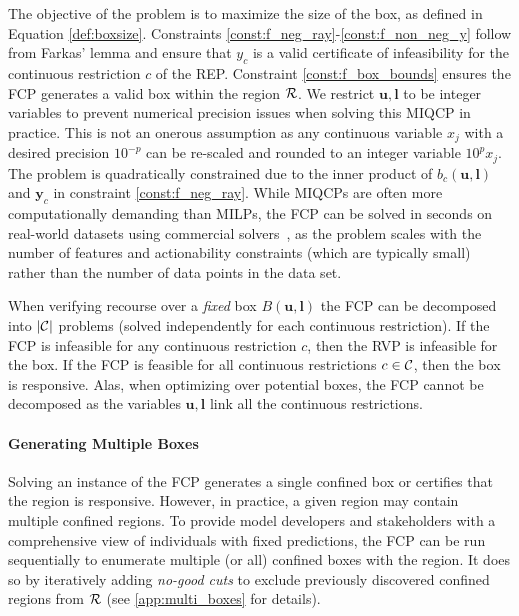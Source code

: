 The objective of the problem is to maximize the size of the box, as defined in Equation \eqref{def:boxsize}. Constraints \eqref{const:f_neg_ray}-\eqref{const:f_non_neg_y} follow from Farkas' lemma and ensure that $y_c$ is a valid certificate of infeasibility for the continuous restriction $c$ of the REP. Constraint \eqref{const:f_box_bounds} ensures the FCP generates a valid box within the region ${\cal R}$. We restrict $\mathbf{u}, \mathbf{l}$ to be integer variables to prevent numerical precision issues when solving this MIQCP in practice. This is not an onerous assumption as any continuous variable $x_j$ with a desired precision $10^{-p}$ can be re-scaled and rounded to an integer variable $10^p x_j$. The problem is quadratically constrained due to the inner product of $b_c(\mathbf{u},\mathbf{l})$ and $\mathbf{y}_c$ in constraint \eqref{const:f_neg_ray}. While MIQCPs are often more computationally demanding than MILPs, the FCP can be solved in seconds on real-world datasets using commercial solvers~\citep[e.g.,][]{achterberg2019gurobi}, as the problem scales with the number of features and actionability constraints (which are typically small) rather than the number of data points in the data set. 

When verifying recourse over a \emph{fixed} box $B(\mathbf{u}, \mathbf{l})$ the FCP can be decomposed into $|{\cal C}|$ problems (solved independently for each continuous restriction). If the FCP is infeasible for any continuous restriction $c$, then the RVP is infeasible for the box. If the FCP is feasible for all continuous restrictions $c \in {\cal C}$, then the box is responsive. Alas, when optimizing over potential boxes, the FCP cannot be decomposed as the variables $\mathbf{u}, \mathbf{l}$ link all the continuous restrictions. 

\paragraph{Generating Multiple Boxes} Solving an instance of the FCP generates a single confined box or certifies that the region is responsive. However, in practice, a given region may contain multiple confined regions. To provide model developers and stakeholders with a comprehensive view of individuals with fixed predictions, the FCP can be run sequentially to enumerate multiple (or all) confined boxes with the region. It does so by iteratively adding \emph{no-good cuts} to exclude previously discovered confined regions from ${\cal R}$ (see \cref{app:multi_boxes} for details).

